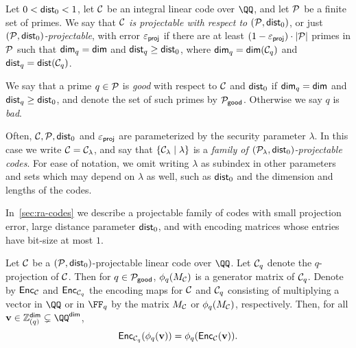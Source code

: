 \documentclass[11pt,letterpaper,usenames,dvipsnames]{article}
\begin{document}
\begin{definition}\label{d: projectable code}
Let $0<\mathsf{dist}_0<1$, let $\mathcal{C}$ be an integral linear code over $\QQ$, and let $\mathcal{P}$ be a finite set of primes. We say that \emph{$\mathcal{C}$ is projectable with respect to $(\mathcal{P}, \mathsf{dist}_0)$}, or just \emph{$(\mathcal{P}, \mathsf{dist}_0)$-projectable}, with error $\varepsilon_{\mathsf{proj}}$ if there are at least $(1-\varepsilon_{\mathsf{proj}})\cdot |\mathcal{P}|$ primes in $\mathcal{P}$ such that $\mathsf{dim}_q=\mathsf{dim}$ and $\mathsf{dist}_q \geq \mathsf{dist}_0$, where $\mathsf{dim}_q= \mathsf{dim}(\mathcal{C}_q)$ and $\mathsf{dist}_q=\mathsf{dist}(\mathcal{C}_q)$.

We say that a prime $q\in \mathcal{P}$ is \emph{good} with respect to $\mathcal{C}$ and $\mathsf{dist}_0$ if $\mathsf{dim}_q=\mathsf{dim}$ and $\mathsf{dist}_q \geq \mathsf{dist}_0$, and denote the set of such primes by $\mathcal{P}_{\mathsf{good}}$. Otherwise we say $q$ is \emph{bad}.

Often, $\mathcal{C}, \mathcal{P}, \mathsf{dist}_0$ and $\varepsilon_{\mathsf{proj}}$ are parameterized by the security parameter $\lambda.$ In this case we write $\mathcal{C}={\mathcal{C}_{\lambda}}$, and say that $\{{\mathcal{C}_{\lambda}}\mid \lambda\}$ is a \emph{family  of $({\mathcal{P}_{\lambda}},\mathsf{dist}_0)$-projectable codes}. For ease of notation, we omit writing $\lambda$ as subindex in other parameters and sets which may depend on $\lambda$ as well, such as $\mathsf{dist}_0$ and the dimension and lengths of the codes.
\end{definition}
    
   
In~\cref{sec:ra-codes} we describe a projectable family of codes with small projection error, large distance parameter $\mathsf{dist}_0$, and with encoding matrices whose entries have bit-size at most $1$.

    
    
\begin{lemma}
\label{lemma:projectable-code-commutativity}

Let $\mathcal{C}$ be a $(\mathcal{P}, \mathsf{dist}_0)$-projectable linear code over $\QQ$. Let $\mathcal{C}_q$ denote the $q$-projection of $\mathcal{C}$. Then for $q \in \mathcal{P}_{\mathsf{good}}$, $\phi_q(M_{\mathcal{C}})$ is a generator matrix of $\mathcal{C}_q$. Denote by $\mathsf{Enc}_{\mathcal{C}}$ and $\mathsf{Enc}_{\mathcal{C}_q}$ the encoding maps for $\mathcal{C}$ and $\mathcal{C}_q$ consisting of multiplying a vector in $\QQ$ or in $\FF_q$ by the matrix $M_{\mathcal{C}}$ or $\phi_q(M_{\mathcal{C}})$, respectively. Then, for all $\vv\in \ZZ_{(q)}^\codedim\subsetneq \QQ^\codedim$, 
\[
\mathsf{Enc}_{\mathcal{C}_q}(\phi_q(\mathbf{v})) = \phi_q(\mathsf{Enc}_{\mathcal{C}}(\mathbf{v})).
\]
\end{lemma}
\end{document}
